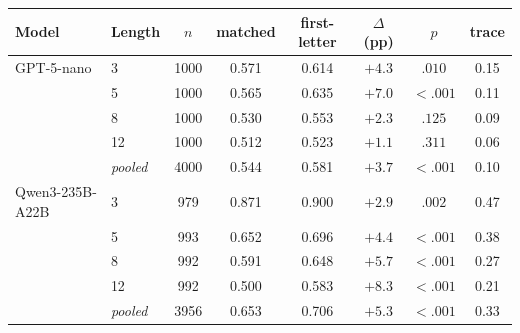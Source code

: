 {\footnotesize\setlength{\tabcolsep}{4pt}
\begin{tabular}{llcccccc}
\toprule
Model & Length & $n$ & matched & first-letter & $\Delta$ (pp) & $p$ & trace \\
\midrule
GPT-5-nano & 3 & 1000 & 0.571 & 0.614 & $+4.3$ & {\boldmath$.010$} & 0.15 \\
 & 5 & 1000 & 0.565 & 0.635 & $+7.0$ & {\boldmath$<.001$} & 0.11 \\
 & 8 & 1000 & 0.530 & 0.553 & $+2.3$ & $.125$ & 0.09 \\
 & 12 & 1000 & 0.512 & 0.523 & $+1.1$ & $.311$ & 0.06 \\
 & \emph{pooled} & 4000 & 0.544 & 0.581 & $+3.7$ & {\boldmath$<.001$} & 0.10 \\
\midrule
Qwen3-235B-A22B & 3 & 979 & 0.871 & 0.900 & $+2.9$ & {\boldmath$.002$} & 0.47 \\
 & 5 & 993 & 0.652 & 0.696 & $+4.4$ & {\boldmath$<.001$} & 0.38 \\
 & 8 & 992 & 0.591 & 0.648 & $+5.7$ & {\boldmath$<.001$} & 0.27 \\
 & 12 & 992 & 0.500 & 0.583 & $+8.3$ & {\boldmath$<.001$} & 0.21 \\
 & \emph{pooled} & 3956 & 0.653 & 0.706 & $+5.3$ & {\boldmath$<.001$} & 0.33 \\
\bottomrule
\end{tabular}}
